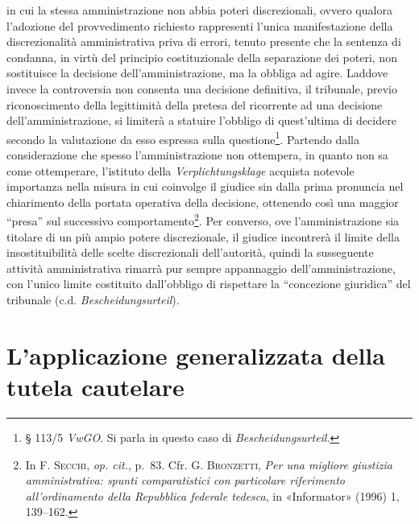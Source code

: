 \documentclass[12pt,it,a4paper,]{report}
\begin{document}
in cui la stessa amministrazione non abbia poteri discrezionali, ovvero
qualora l'adozione del provvedimento richiesto rappresenti l'unica
manifestazione della discrezionalità amministrativa priva di errori,
tenuto presente che la sentenza di condanna, in virtù del principio
costituzionale della separazione dei poteri, non sostituisce la
decisione dell'amministrazione, ma la obbliga ad agire. Laddove invece
la controversia non consenta una decisione definitiva, il tribunale,
previo riconoscimento della legittimità della pretesa del ricorrente ad
una decisione dell'amministrazione, si limiterà a statuire l'obbligo di
quest'ultima di decidere secondo la valutazione da esso espressa sulla
questione\footnote{§ 113/5 \emph{VwGO}. Si parla in questo caso di
  \emph{Bescheidungsurteil}.}. Partendo dalla considerazione che spesso
l'amministrazione non ottempera, in quanto non sa come ottemperare,
l'istituto della \emph{Verplichtungsklage} acquista notevole importanza
nella misura in cui coinvolge il giudice sin dalla prima pronuncia nel
chiarimento della portata operativa della decisione, ottenendo così una
maggior ``presa'' sul successivo comportamento\footnote{In
  \textsc{F. Secchi}, \emph{op. cit.}, p.~83. Cfr. G.
  \textsc{Bronzetti}, \emph{Per una migliore giustizia amministrativa:
  spunti comparatistici con particolare riferimento all'ordinamento
  della Repubblica federale tedesca}, in {«Informator»} (1996) 1,
  139--162.}. Per converso, ove l'amministrazione sia titolare di un più
ampio potere discrezionale, il giudice incontrerà il limite della
insostituibilità delle scelte discrezionali dell'autorità, quindi la
susseguente attività amministrativa rimarrà pur sempre appannaggio
dell'amministrazione, con l'unico limite costituito dall'obbligo di
rispettare la ``concezione giuridica'' del tribunale (c.d.
\emph{Bescheidungsurteil}).

\hypertarget{lapplicazione-generalizzata-della-tutela-cautelare}{%
\section{L'applicazione generalizzata della tutela
cautelare}\label{lapplicazione-generalizzata-della-tutela-cautelare}}
\end{document}
